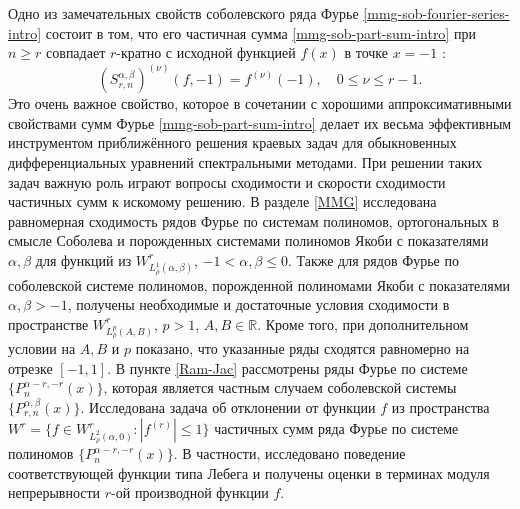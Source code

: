 Одно из замечательных свойств соболевского ряда Фурье \eqref{mmg-sob-fourier-series-intro} состоит в том, что его частичная сумма \eqref{mmg-sob-part-sum-intro} при $n \ge r$ совпадает $r$-кратно с исходной функцией $f(x)$ в точке $x=-1$ \cite[с. 228]{mmg-Shii-izvran2018}:
\begin{equation*}
	(S^{\alpha,\beta}_{r,n})^{(\nu)}(f,-1)=f^{(\nu)}(-1), \quad 0\le\nu\le r-1.
\end{equation*}
Это очень важное свойство, которое в сочетании с хорошими аппроксимативными свойствами сумм Фурье \eqref{mmg-sob-part-sum-intro}
делает их весьма эффективным инструментом приближённого решения краевых задач для обыкновенных дифференциальных уравнений спектральными методами. При решении таких задач важную роль играют вопросы сходимости и скорости сходимости частичных сумм к искомому решению.
В разделе \ref{MMG} исследована равномерная сходимость рядов Фурье по системам полиномов, ортогональных в смысле Соболева и порожденных системами полиномов Якоби с показателями $\alpha, \beta$ для функций из $W^r_{L^1_\rho(\alpha,\beta)}$, $-1 <\alpha, \beta  \le 0$. Также для рядов Фурье по соболевской системе полиномов, порожденной полиномами Якоби с показателями $\alpha, \beta  > -1$, получены необходимые и достаточные условия сходимости в пространстве $W^r_{L^p_\rho(A,B)}$, $p > 1$, $A, B \in \mathbb{R}$. Кроме того, при дополнительном условии на $A, B$ и $p$ показано, что указанные ряды сходятся равномерно на отрезке $[-1,1]$.
В пункте \ref{Ram-Jac} рассмотрены ряды Фурье по системе $\{P_n^{\alpha-r,-r}(x)\}$, которая является частным случаем соболевской системы $\{P_{r,n}^{\alpha,\beta}(x)\}$. Исследована задача об отклонении от функции $f$ из пространства $W^r=\{f\in W^r_{L^2_\rho(\alpha,0)}: |f^{(r)}|\le1\}$ частичных сумм ряда Фурье по системе полиномов $\{P_n^{\alpha-r,-r}(x)\}$. В частности, исследовано поведение соответствующей функции типа Лебега и получены оценки в терминах модуля непрерывности $r$-ой производной функции $f$.

